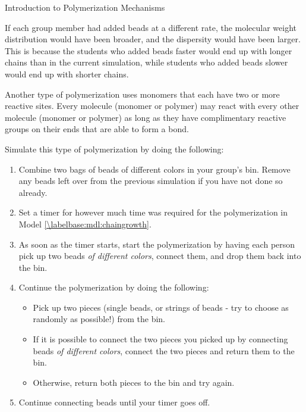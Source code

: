 \begin{activity}{Introduction to Polymerization Mechanisms}
\begin{ctqs}
		\begin{solution}[1.9in]{}
			If each group member had added beads at a different rate, the molecular weight distribution would have been broader, and the dispersity would have been larger.  This is because the students who added beads faster would end up with longer chains than in the current simulation, while students who added beads slower would end up with shorter chains.
		\end{solution}
		
\end{ctqs}

\begin{model}
\label{\labelbase:mdl:stepgrowth}

	Another type of polymerization uses monomers that each have two or more reactive sites.  Every molecule (monomer or polymer) may react with every other molecule (monomer or polymer) as long as they have complimentary reactive groups on their ends that are able to form a bond.
	
	Simulate this type of polymerization by doing the following:
	\begin{enumerate}
		\item Combine two bags of beads of different colors in your group's bin.  Remove any beads left over from the previous simulation if you have not done so already.
		\item Set a timer for however much time was required for the polymerization in Model \ref{\labelbase:mdl:chaingrowth}.
		\item As soon as the timer starts, start the polymerization by having each person pick up two beads \emph{of different colors}, connect them, and drop them back into the bin.
		\item Continue the polymerization by doing the following:
			\begin{itemize}
				\item Pick up two pieces (single beads, or strings of beads - try to choose as randomly as possible!) from the bin.
				\item If it is possible to connect the two pieces you picked up by connecting beads \emph{of different colors}, connect the two pieces and return them to the bin.
				\item Otherwise, return both pieces to the bin and try again.
			\end{itemize}
		\item Continue connecting beads until your timer goes off.
	\end{enumerate}
	

\end{model}
\end{activity}
